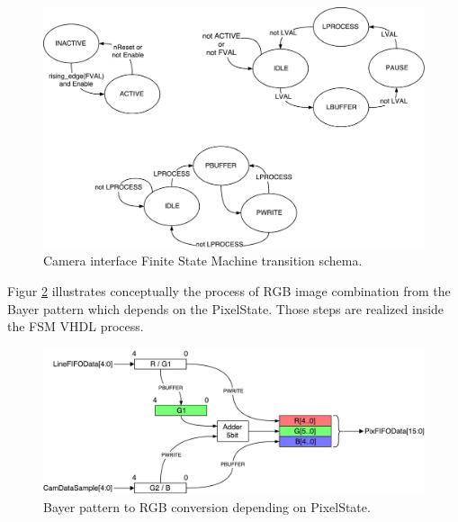 \documentclass{article}
\begin{document}
\begin{figure}[H]
\centering
\includegraphics[width=\textwidth]{images/CameraInterfaceFSM.pdf}
\caption{Camera interface Finite State Machine transition schema.}
\label{fig:camera_interface_fsm}
\end{figure}

Figur \ref{fig:camera_rgb} illustrates conceptually the process of RGB image combination from the Bayer pattern which depends on the PixelState.
Those steps are realized inside the FSM VHDL process.

\begin{figure}[H]
\centering
\includegraphics[width=\textwidth]{images/CameraInterfaceBayerToRGB.pdf}
\caption{Bayer pattern to RGB conversion depending on PixelState.}
\label{fig:camera_rgb}
\end{figure}
\end{document}
